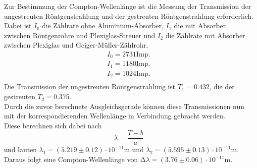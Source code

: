 Zur Bestimmung der Compton-Wellenlänge ist die Messung der Transmission
der ungestreuten Röntgenstrahlung und der gestreuten Röntgenstrahlung erforderlich.
Dabei ist $I_0$ die Zählrate ohne Aluminium-Absorber, $I_1$ die mit Absorber
zwischen Röntgenröhre und Plexiglas-Streuer und $I_2$ die Zählrate mit 
Absorber zwischen Plexiglas und Geiger-Müller-Zählrohr. \\
\begin{align*}
    I_0 = 2731 \text{Imp.}\\
    I_1 = 1180 \text{Imp.}\\
    I_2 = 1024 \text{Imp.}\\
\end{align*}
\noindent Die Transmission der ungestreuten Röntgenstrahlung ist $T_1 = 0.432$,
die der gestreuten $T_2 = 0.375$.\\
Durch die zuvor berechnete Ausgleichsgerade können diese Transmissionen nun
mit der korrespondierenden Wellenlänge in Verbindung gebracht werden.\\
Diese berechnen sich dabei nach
\begin{equation}
    \lambda = \frac{T - b}{a}
\end{equation}
und lauten $\lambda_1 = \left(5.219 \pm 0.12 \right) \cdot 10^{-11} \si{\m}$ und $\lambda_2 = \left(5.595 \pm 0.13 \right) \cdot 10^{-11} \si{\m}$.\\
Daraus folgt eine Compton-Wellenlänge von $\increment \lambda = \left(3.76 \pm 0.06 \right) \cdot 10^{-11} \si{\m}$.